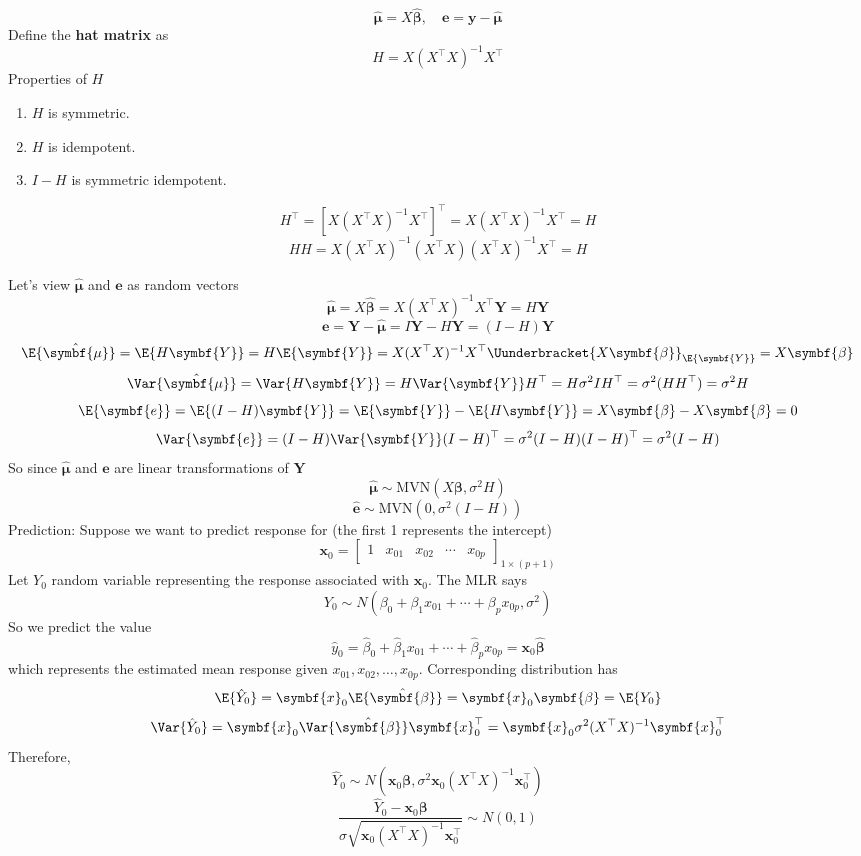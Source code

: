 \[ \hat{\symbf{\mu}}=X\hat{\symbf{\beta}},
    \quad \symbf{e}=\symbf{y}-\hat{\symbf{\mu}} \]
Define the \textbf{hat matrix} as
\[ H=X(X^\top X)^{-1}X^{\top} \]
Properties of $ H $
\begin{enumerate}[label=(\arabic*)]
    \item $ H $ is symmetric.
    \item $ H $ is idempotent.
    \item $ I-H $ is symmetric idempotent.
\end{enumerate}
\[ H^\top=[X(X^\top X)^{-1}X^\top]^\top=X(X^\top X)^{-1}X^\top=H \]
\[ HH=X(X^\top X)^{-1}(X^\top X)(X^\top X)^{-1}X^\top=H \]

Let's view $ \hat{\symbf{\mu}} $ and $ \symbf{e} $
as random vectors
\[ \hat{\symbf{\mu}}=X\hat{\symbf{\beta}}=
    X(X^\top X)^{-1}X^\top \symbf{Y}=H\symbf{Y} \]
\[ \symbf{e}=\symbf{Y}-\hat{\symbf{\mu}}=I\symbf{Y}-H\symbf{Y}=
    (I-H)\symbf{Y} \]
\[ \E{\hat{\symbf{\mu}}}=\E{H\symbf{Y}}=H\E{\symbf{Y}}=
    X(X^\top X)^{-1}X^\top \Uunderbracket{X\symbf{\beta}}_{\E{\symbf{Y}}}
    =X\symbf{\beta}
\]
\[ \Var{\hat{\symbf{\mu}}}=\Var{H\symbf{Y}}=
    H\Var{\symbf{Y}}H^\top=H\sigma^2I H^\top=\sigma^2(HH^\top)=\sigma^2H \]
\[ \E{ \symbf{e}}=
    \E{(I-H)\symbf{Y}}=\E{\symbf{Y}}-\E{H\symbf{Y}}=X\symbf{\beta}-X\symbf{\beta}=0 \]
\[ \Var{\symbf{e}}=
    (I-H)\Var{\symbf{Y}}(I-H)^\top=\sigma^2(I-H)(I-H)^\top=\sigma^2(I-H) \]
So since $ \hat{\symbf{\mu}} $ and $ \symbf{e} $
are linear transformations of $ \symbf{Y} $
\[ \hat{\symbf{\mu}}\sim\text{MVN}(X\symbf{\beta},\sigma^2 H) \]
\[ \hat{\symbf{e}}\sim\text{MVN}(0,\sigma^2(I-H)) \]
Prediction: Suppose we want to predict response for
(the first 1 represents the intercept)
\[ \symbf{x}_0=\begin{bmatrix}
        1 & x_{01} & x_{02} & \cdots & x_{0p}
    \end{bmatrix}_{1\times (p+1)} \]
Let $ Y_0 $ random variable representing the response
associated with $ \symbf{x}_0 $. The MLR says
\[ Y_0 \sim N(\beta_0+\beta_1x_{01}+\cdots+\beta_p x_{0p},\sigma^2) \]
So we predict the value
\[ \hat{y}_0=\hat{\beta}_0+\hat{\beta}_1x_{01}+\cdots+
    \hat{\beta}_p x_{0p}=\symbf{x}_0\hat{\symbf{\beta}} \]
which represents the estimated mean response given
$ x_{01},x_{02},\ldots,x_{0p} $. Corresponding distribution
has
\[ \E{\hat{Y}_0}=\symbf{x}_0\E{\hat{\symbf{\beta}}}=\symbf{x}_0\symbf{\beta}
    =\E{Y_0} \]
\[ \Var{\hat{Y}_0}=\symbf{x}_0\Var{\hat{\symbf{\beta}}}\symbf{x}_0^\top=
    \symbf{x}_0\sigma^2(X^\top X)^{-1}\symbf{x}_0^\top \]
Therefore,
\[ \hat{Y}_0 \sim N(\symbf{x}_0\symbf{\beta},\sigma^2\symbf{x}_0(X^\top X)^{-1}
    \symbf{x}_0^\top) \]
\[ \frac{\hat{Y}_0-\symbf{x}_0\symbf{\beta}}{\sigma\sqrt{
            \symbf{x}_0(X^\top X)^{-1}\symbf{x}_0^\top
        }}\sim N(0,1)  \]

